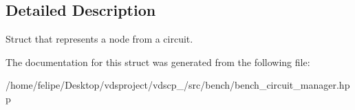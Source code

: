 \subsection{Detailed Description}
Struct that represents a node from a circuit. 

The documentation for this struct was generated from the following file\+:\begin{DoxyCompactItemize}
\item 
/home/felipe/\+Desktop/vdsproject/vdscp\+\_/src/bench/bench\+\_\+circuit\+\_\+manager.\+hpp\end{DoxyCompactItemize}
